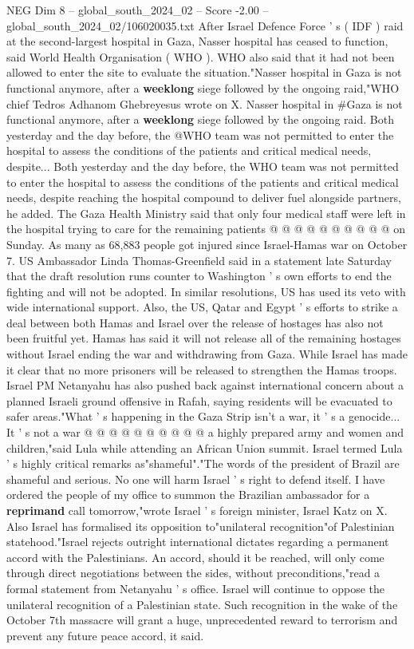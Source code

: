 \begin{textsample}{NEG Dim 8 – global\_south\_2024\_02 – Score -2.00 – global\_south\_2024\_02/106020035.txt}  \label{ex:f8_neg_059}
After Israel Defence Force ' s ( IDF ) raid at the second-largest hospital in Gaza, Nasser hospital has ceased to function, said World Health Organisation ( WHO ).
WHO also said that it had not been allowed to enter the site to evaluate the situation."Nasser hospital in Gaza is not functional anymore, after a \textbf{weeklong} siege followed by the ongoing raid,"WHO chief Tedros Adhanom Ghebreyesus wrote on X.
Nasser hospital in \#Gaza is not functional anymore, after a \textbf{weeklong} siege followed by the ongoing raid.
Both yesterday and the day before, the @WHO team was not permitted to enter the hospital to assess the conditions of the patients and critical medical needs, despite...
Both yesterday and the day before, the WHO team was not permitted to enter the hospital to assess the conditions of the patients and critical medical needs, despite reaching the hospital compound to deliver fuel alongside partners, he added.
The Gaza Health Ministry said that only four medical staff were left in the hospital trying to care for the remaining patients @ @ @ @ @ @ @ @ @ @ on Sunday.
As many as 68,883 people got injured since Israel-Hamas war on October 7.
US Ambassador Linda Thomas-Greenfield said in a statement late Saturday that the draft resolution runs counter to Washington ' s own efforts to end the fighting and will not be adopted.
In similar resolutions, US has used its veto with wide international support.
Also, the US, Qatar and Egypt ' s efforts to strike a deal between both Hamas and Israel over the release of hostages has also not been fruitful yet.
Hamas has said it will not release all of the remaining hostages without Israel ending the war and withdrawing from Gaza.
While Israel has made it clear that no more prisoners will be released to strengthen the Hamas troops.
Israel PM Netanyahu has also pushed back against international concern about a planned Israeli ground offensive in Rafah, saying residents will be evacuated to safer areas."What ' s happening in the Gaza Strip isn't a war, it ' s a genocide...
It ' s not a war @ @ @ @ @ @ @ @ @ @ a highly prepared army and women and children,"said Lula while attending an African Union summit.
Israel termed Lula ' s highly critical remarks as"shameful"."The words of the president of Brazil are shameful and serious.
No one will harm Israel ' s right to defend itself.
I have ordered the people of my office to summon the Brazilian ambassador for a \textbf{reprimand} call tomorrow,"wrote Israel ' s foreign minister, Israel Katz on X.
Also Israel has formalised its opposition to"unilateral recognition"of Palestinian statehood."Israel rejects outright international dictates regarding a permanent accord with the Palestinians.
An accord, should it be reached, will only come through direct negotiations between the sides, without preconditions,"read a formal statement from Netanyahu ' s office.
Israel will continue to oppose the unilateral recognition of a Palestinian state.
Such recognition in the wake of the October 7th massacre will grant a huge, unprecedented reward to terrorism and prevent any future peace accord, it said.

\end{textsample}
